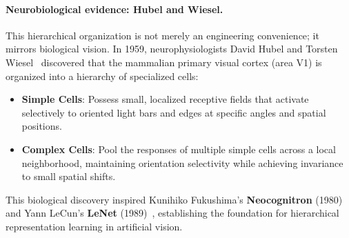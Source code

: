 \paragraph{Neurobiological evidence: Hubel and Wiesel.}
This hierarchical organization is not merely an engineering convenience; it mirrors biological vision. In 1959, neurophysiologists David Hubel and Torsten Wiesel~\cite{hubel1959receptive,hubel1962receptive} discovered that the mammalian primary visual cortex (area V1) is organized into a hierarchy of specialized cells:
\begin{itemize}[leftmargin=*]
  \item \textbf{Simple Cells}: Possess small, localized receptive fields that activate selectively to oriented light bars and edges at specific angles and spatial positions.
  \item \textbf{Complex Cells}: Pool the responses of multiple simple cells across a local neighborhood, maintaining orientation selectivity while achieving invariance to small spatial shifts.
\end{itemize}
This biological discovery inspired Kunihiko Fukushima's \textbf{Neocognitron} (1980)~\cite{fukushima1980neocognitron} and Yann LeCun's \textbf{LeNet} (1989)~\cite{lecun1989backpropagation}, establishing the foundation for hierarchical representation learning in artificial vision.

